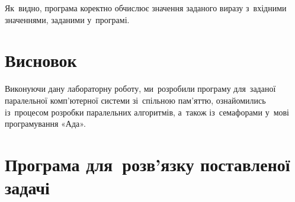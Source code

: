 \documentclass[
  a4paper,
  oneside,
  BCOR = 10mm,
  DIV = 12,
  12pt,
  headings = normal,
]{scrartcl}
\begin{document}
      Як~видно, програма коректно обчислює значення заданого виразу з~вхідними значеннями, заданими у~програмі.

  \section{Висновок}
    Виконуючи дану лабораторну роботу, ми~розробили програму для~заданої паралельної комп'ютерної системи зі~спільною пам'яттю, ознайомились із~процесом розробки паралельних алгоритмів, а~також із~семафорами у~мові програмування «Ада». 

  \appendix
  \section{Програма для~розв'язку поставленої задачі}

\end{document}
